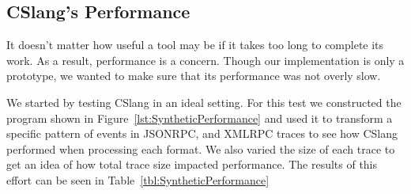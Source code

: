 %
%
%
%


\subsection{CSlang's Performance}

It doesn't matter how useful a tool may be
if it takes too long to complete its work.
As a result, performance is a concern.  Though our implementation is
only a prototype, we wanted to make sure that its performance was not
overly slow.

We started by testing
CSlang
in an ideal setting.  For this test we constructed the program
shown in Figure~\ref{lst:SyntheticPerformance}
and used it to transform a specific
pattern of events in JSONRPC, and XMLRPC traces to
see how CSlang performed when processing each format.  We also varied the
size of each trace to get an idea of how total trace size impacted
performance.  The results of this effort can be seen in
Table~\ref{tbl:SyntheticPerformance}


